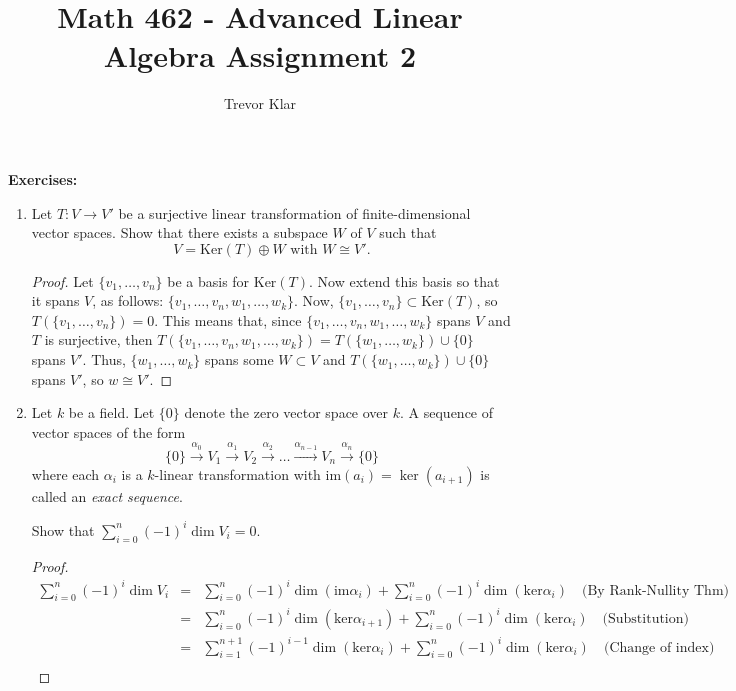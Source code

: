 \documentclass[letterpaper]{article}
\title{Math 462 - Advanced Linear Algebra \linebreak
	Assignment 2}
\author{Trevor Klar}
\begin{document}
\maketitle

\noindent \textbf{Exercises:}
\begin{enumerate}
\item Let $T: V \to V'$ be a surjective linear transformation of finite-dimensional vector spaces. Show that there exists a subspace $W$ of $V$ such that
$$V = \text{Ker}(T) \oplus W \text{ with } W\cong V'.$$

\begin{proof}
Let $\{v_1, \ldots, v_n\}$ be a basis for $\text{Ker}(T)$. Now extend this basis so that it spans $V$, as follows: $\{v_1, \ldots, v_n, w_1, \ldots, w_k\}$. Now, $\{v_1, \ldots, v_n\} \subset \text{Ker}(T)$, so $T(\{v_1, \ldots, v_n\})=0$. This means that, since $\{v_1, \ldots, v_n, w_1, \ldots, w_k\}$ spans $V$ and $T$ is surjective, then $T(\{v_1, \ldots, v_n, w_1, \ldots, w_k\})=T(\{w_1, \ldots, w_k\})\cup\{0\}$ spans $V'$. Thus, $\{w_1, \ldots, w_k\}$ spans some $W\subset V$ and $T(\{w_1, \ldots, w_k\})\cup\{0\}$ spans $V'$, so $w\cong V'$. 
\end{proof}

\item Let $k$ be a field. Let $\{0\}$ denote the zero vector space over $k$. A sequence of vector spaces of the form 
$$\{0\}\xrightarrow{\alpha_0}V_1\xrightarrow{\alpha_1}V_2\xrightarrow{\alpha_2}\ldots\xrightarrow{\alpha_{n-1}}V_n\xrightarrow{\alpha_n}\{0\}$$
where each $\alpha_i$ is a $k$-linear transformation with im$(a_i)=\ker(a_{i+1})$ is called an \emph{exact sequence}. 

Show that $\sum\limits_{i=0}^n(-1)^i\dim V_i=0$. 

\begin{proof}
\[
\begin{array}{rcl}
\sum\limits_{i=0}^n(-1)^i\dim V_i&=&\sum\limits_{i=0}^n(-1)^i\dim (\text{im}\alpha_i)+\sum\limits_{i=0}^n(-1)^i\dim (\text{ker}\alpha_i) \quad \text{(By Rank-Nullity Thm)}\\ 

&=&\sum\limits_{i=0}^n(-1)^i\dim (\text{ker}\alpha_{i+1})+\sum\limits_{i=0}^n(-1)^i\dim (\text{ker}\alpha_i)\quad \text{(Substitution)}\\ 

&=&\sum\limits_{i=1}^{n+1}(-1)^{i-1}\dim (\text{ker}\alpha_{i})+\sum\limits_{i=0}^n(-1)^i\dim (\text{ker}\alpha_i)\quad \text{(Change of index)}\\ 


\end{array}\]
\end{proof}
\end{enumerate}
\end{document}
